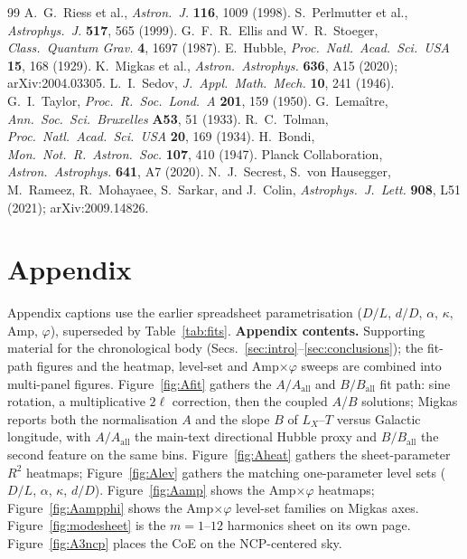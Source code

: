 \documentclass[11pt,a4paper]{article}
\begin{document}
\begingroup
\footnotesize
\setlength{\itemsep}{0.1em}
\setlength{\parsep}{0pt}
\begin{thebibliography}{99}
A.~G.~Riess et al., \textit{Astron.\ J.} \textbf{116}, 1009 (1998).
S.~Perlmutter et al., \textit{Astrophys.\ J.} \textbf{517}, 565 (1999).
G.~F.~R.~Ellis and W.~R.~Stoeger, \textit{Class.\ Quantum Grav.} \textbf{4}, 1697 (1987).
E.~Hubble, \textit{Proc.\ Natl.\ Acad.\ Sci.\ USA} \textbf{15}, 168 (1929).
K.~Migkas et al., \textit{Astron.\ Astrophys.} \textbf{636}, A15 (2020); arXiv:2004.03305.
L.~I.~Sedov, \textit{J.\ Appl.\ Math.\ Mech.} \textbf{10}, 241 (1946).
G.~I.~Taylor, \textit{Proc.\ R.\ Soc.\ Lond.\ A} \textbf{201}, 159 (1950).
G.~Lema\^itre, \textit{Ann.\ Soc.\ Sci.\ Bruxelles} \textbf{A53}, 51 (1933).
R.~C.~Tolman, \textit{Proc.\ Natl.\ Acad.\ Sci.\ USA} \textbf{20}, 169 (1934).
H.~Bondi, \textit{Mon.\ Not.\ R.\ Astron.\ Soc.} \textbf{107}, 410 (1947).
Planck Collaboration, \textit{Astron.\ Astrophys.} \textbf{641}, A7 (2020).
N.~J.~Secrest, S.~von Hausegger, M.~Rameez, R.~Mohayaee, S.~Sarkar, and J.~Colin, \textit{Astrophys.\ J.\ Lett.} \textbf{908}, L51 (2021); arXiv:2009.14826.
\end{thebibliography}
\endgroup

\section*{Appendix}
Appendix captions use the earlier spreadsheet parametrisation (\(D/L\), \(d/D\), \(\alpha\), \(\kappa\), Amp, \(\varphi\)), superseded by Table~\ref{tab:fits}.
\noindent\textbf{Appendix contents.}
Supporting material for the chronological body (Secs.~\ref{sec:intro}--\ref{sec:conclusions}); the fit-path figures and the heatmap, level-set and Amp$\times\varphi$ sweeps are combined into multi-panel figures.
Figure~\ref{fig:Afit} gathers the \(A/A_{\mathrm{all}}\) and \(B/B_{\mathrm{all}}\) fit path: sine rotation, a multiplicative \(2\ell\) correction, then the coupled \(A\)/\(B\) solutions; Migkas reports both the normalisation \(A\) and the slope \(B\) of \(L_X\)--\(T\) versus Galactic longitude, with \(A/A_{\mathrm{all}}\) the main-text directional Hubble proxy and \(B/B_{\mathrm{all}}\) the second feature on the same bins.
Figure~\ref{fig:Aheat} gathers the sheet-parameter \(R^2\) heatmaps; Figure~\ref{fig:Alev} gathers the matching one-parameter level sets (\(D/L\), \(\alpha\), $\kappa$, $d/D$).
Figure~\ref{fig:Aamp} shows the Amp$\times\varphi$ heatmaps; Figure~\ref{fig:Aampphi} shows the Amp$\times\varphi$ level-set families on Migkas axes.
Figure~\ref{fig:modesheet} is the \(m=1\)--\(12\) harmonics sheet on its own page.
Figure~\ref{fig:A3ncp} places the CoE on the NCP-centered sky.
\end{document}
